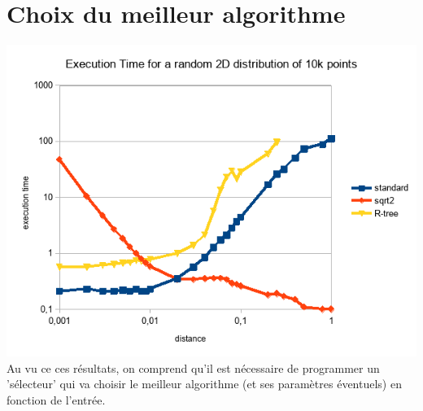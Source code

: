 \documentclass[a4paper,11pt]{article}
\begin{document}
\section{Choix du meilleur algorithme}
\begin{center}
\includegraphics[scale=3]{comparaison_algos.png}
\bigbreak
Au vu ce ces résultats, on comprend qu'il est nécessaire de programmer un 'sélecteur' qui va choisir le meilleur algorithme (et ses paramètres éventuels) en fonction de l'entrée. 
\end{center}
\end{document}

